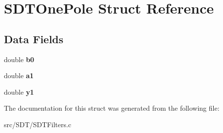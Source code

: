 \hypertarget{struct_s_d_t_one_pole}{}\section{S\+D\+T\+One\+Pole Struct Reference}
\label{struct_s_d_t_one_pole}
\subsection*{Data Fields}
\begin{DoxyCompactItemize}
\item 
\hypertarget{struct_s_d_t_one_pole_a798947bd96f7e2615d107b383cc4b9c6}{}double {\bfseries b0}\label{struct_s_d_t_one_pole_a798947bd96f7e2615d107b383cc4b9c6}

\item 
\hypertarget{struct_s_d_t_one_pole_a5d015a3751aec61f2442b957cb6f517a}{}double {\bfseries a1}\label{struct_s_d_t_one_pole_a5d015a3751aec61f2442b957cb6f517a}

\item 
\hypertarget{struct_s_d_t_one_pole_ac3b72e5b77595ca2340ecf8ccfe5fd99}{}double {\bfseries y1}\label{struct_s_d_t_one_pole_ac3b72e5b77595ca2340ecf8ccfe5fd99}

\end{DoxyCompactItemize}


The documentation for this struct was generated from the following file\+:\begin{DoxyCompactItemize}
\item 
src/\+S\+D\+T/S\+D\+T\+Filters.\+c\end{DoxyCompactItemize}
